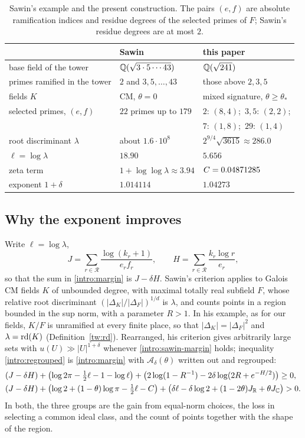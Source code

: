 \begin{table}[htbp]
\centering
\caption{Sawin's example and the present construction. The pairs $(e,f)$
are absolute ramification indices and residue degrees of the selected
primes of $F$; Sawin's residue degrees are at most $2$.}
\label{intro:table-constructions}
\begin{tabular}{lll}
\toprule
 & Sawin \cite{Sawin2026} & this paper\\
\midrule
base field of the tower & $\mathbb Q(\sqrt{3\cdot5\cdots43})$ & $\mathbb Q(\sqrt{241})$\\
primes ramified in the tower & $2$ and $3,5,\dots,43$ & those above $2,3,5$\\
fields $K$ & CM, $\theta=0$ & mixed signature, $\theta\ge\theta_*$\\
selected primes, $(e,f)$ & $22$ primes up to $179$ & $2{:}\,(8,4)$;\ $3,5{:}\,(2,2)$;\\
 & & $7{:}\,(1,8)$;\ $29{:}\,(1,4)$\\
root discriminant $\lambda$ & about $1.6\cdot10^8$ & $2^{9/4}\sqrt{3615}\approx286.0$\\
$\ell=\log\lambda$ & $18.90$ & $5.656$\\
zeta term & $1+\log\log\lambda\approx3.94$ & $C=0.04871285$\\
exponent $1+\delta$ & $1.014114$ & $1.04273$\\
\bottomrule
\end{tabular}
\end{table}

\subsection{Why the exponent improves}\label{intro:why}
Write $\ell=\log\lambda$,
\[
 J=\sum_{r\in\mathcal R}\frac{\log(k_r+1)}{e_rf_r},\qquad
 H=\sum_{r\in\mathcal R}\frac{k_r\log r}{e_r},
\]
so that the sum in \eqref{intro:margin} is $J-\delta H$. Sawin's
criterion \cite[Proposition~10]{Sawin2026} applies to Galois CM fields
$K$ of unbounded degree, with maximal totally real subfield $F$, whose
relative root discriminant $(|\Delta_K|/|\Delta_F|)^{1/d}$ is $\lambda$,
and counts points in a region bounded in the sup norm, with a parameter
$R>1$. In his example, as for our fields, $K/F$ is unramified at every
finite place, so that $|\Delta_K|=|\Delta_F|^2$ and $\lambda=\operatorname{rd}(K)$
(Definition~\ref{tw:rd}).
Rearranged, his criterion gives arbitrarily
large sets with $u(U)\gg|U|^{1+\delta}$ whenever
\eqref{intro:sawin-margin} holds; inequality \eqref{intro:regrouped} is
\eqref{intro:margin} with $\mathcal A_\delta(\theta)$ written out and
regrouped:
\begin{align}
 &(J-\delta H)+\bigl(\log2\pi-\tfrac12\ell-1-\log\ell\bigr)
 +\bigl(2\log(1-R^{-1})-2\delta\log(2R+e^{-H/2})\bigr)\ge0,
 \label{intro:sawin-margin}\\
 &(J-\delta H)+\bigl(\log2+(1-\theta)\log\pi-\tfrac12\ell-C\bigr)
 +\bigl(\delta\ell-\delta\log2+(1-2\theta)J_\mathbb R+\theta J_\mathbb C\bigr)>0.
 \label{intro:regrouped}
\end{align}
In both, the three groups are the gain from equal-norm choices, the loss
in selecting a common ideal class, and the count of points together
with the shape of the region.

